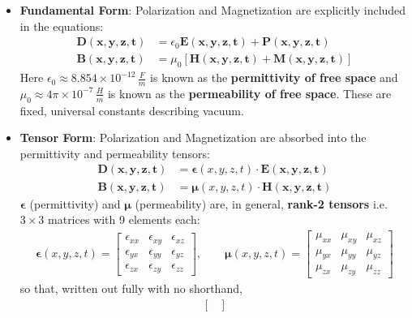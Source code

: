 \begin{itemize}
  \item \textbf{Fundamental Form}: Polarization and Magnetization are explicitly
    included in the equations:
    \begin{align*}
      \mathbf{D(x,y,z,t)} &= \epsilon_0 \mathbf{E(x,y,z,t)} + \mathbf{P(x,y,z,t)} \tag{10a} \\
      \mathbf{B(x,y,z,t)} &= \mu_0 \left[\mathbf{H(x,y,z,t)} + \mathbf{M(x,y,z,t)}\right] \tag{10b}
    \end{align*}
    Here \( \epsilon_0 \approx 8.854 \times 10^{-12} \, \frac{F}{m} \) is known
    as the \textbf{permittivity of free space} and \( \mu_0 \approx 4\pi \times 10^{-7} \, \frac{H}{m} \)
    is known as the \textbf{permeability of free space}. These are fixed, universal
    constants describing vacuum.
  \item \textbf{Tensor Form}: Polarization and Magnetization are absorbed into the
    permittivity and permeability tensors:
    \begin{align*}
      \mathbf{D(x,y,z,t)} &= \boldsymbol{\epsilon}(x,y,z,t) \cdot \mathbf{E(x,y,z,t)} \tag{11a} \\
      \mathbf{B(x,y,z,t)} &= \boldsymbol{\mu}(x,y,z,t) \cdot \mathbf{H(x,y,z,t)} \tag{11b}
    \end{align*}
    \( \boldsymbol{\epsilon} \) (permittivity) and \( \boldsymbol{\mu} \)
    (permeability) are, in general, \textbf{rank-2 tensors} i.e. \( 3 \times 3 \)
    matrices with 9 elements each:
    \begin{align*}
      \boldsymbol{\epsilon}(x,y,z,t) = \begin{bmatrix}
        \epsilon_{xx} & \epsilon_{xy} & \epsilon_{xz} \\
        \epsilon_{yx} & \epsilon_{yy} & \epsilon_{yz} \\
        \epsilon_{zx} & \epsilon_{zy} & \epsilon_{zz}
      \end{bmatrix}, \qquad
      \boldsymbol{\mu}(x,y,z,t) = \begin{bmatrix}
        \mu_{xx} & \mu_{xy} & \mu_{xz} \\
        \mu_{yx} & \mu_{yy} & \mu_{yz} \\
        \mu_{zx} & \mu_{zy} & \mu_{zz}
      \end{bmatrix}
    \end{align*}
    so that, written out fully with no shorthand,
    \begin{align*}
      \begin{bmatrix}

\end{bmatrix}
\end{align*}
\end{itemize}

